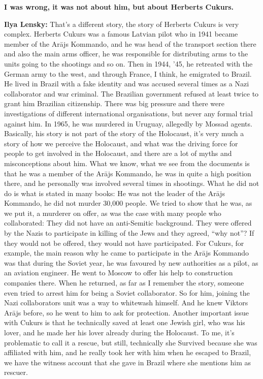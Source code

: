 \textbf{I was wrong, it was not about him, but about Herberts Cukurs.} 

\textbf{Ilya Lensky:} That’s a different story, the story of Herberts Cukurs is very complex. Herberts Cukurs was a famous Latvian pilot who in 1941 became member of the Arājs Kommando, and he was head of the transport section there and also the main arms officer, he was responsible for distributing arms to the units going to the shootings and so on. Then in 1944, '45, he retreated with the German army to the west, and through France, I think, he emigrated to Brazil. He lived in Brazil with a fake identity and was accused several times as a Nazi collaborator and war criminal. The Brazilian government refused at least twice to grant him Brazilian citizenship. There was big pressure and there were investigations of different international organisations, but never any formal trial against him. In 1965, he was murdered in Uruguay, allegedly by Mossad agents. Basically, his story is not part of the story of the Holocaust, it’s very much a story of how we perceive the Holocaust, and what was the driving force for people to get involved in the Holocaust, and there are a lot of myths and misconceptions about him. What we know, what we see from the documents is that he was a member of the Arājs Kommando, he was in quite a high position there, and he personally was involved several times in shootings. What he did not do is what is stated in many books: He was not the leader of the Arājs Kommando, he did not murder 30,000 people. We tried to show that he was, as we put it, a murderer on offer, as was the case with many people who collaborated: They did not have an anti-Semitic background. They were offered by the Nazis to participate in killing of the Jews and they agreed, ``why not''? If they would not be offered, they would not have participated. For Cukurs, for example, the main reason why he came to participate in the Arājs Kommando was that during the Soviet year, he was favoured by new authorities as a pilot, as an aviation engineer. He went to Moscow to offer his help to construction companies there. When he returned, as far as I remember the story, someone even tried to arrest him for being a Soviet collaborator. So for him, joining the Nazi collaborators unit was a way to whitewash himself. And he knew Viktors Arājs before, so he went to him to ask for protection. Another important issue with Cukurs is that he technically saved at least one Jewish girl, who was his lover, and he made her his lover already during the Holocaust. To me, it’s problematic to call it a rescue, but still, technically she Survived because she was affiliated with him, and he really took her with him when he escaped to Brazil, we have the witness account that she gave in Brazil where she mentions him as rescuer. \\
